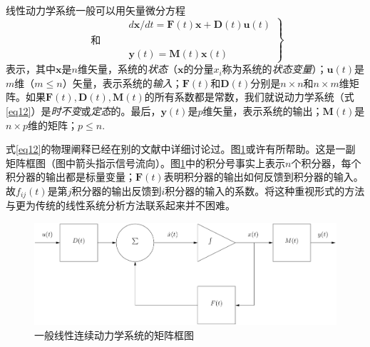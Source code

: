 \documentclass[UTF8,adobefonts]{ctexart}
\begin{document}
线性动力学系统一般可以用矢量微分方程
\begin{equation}
\label{eq12}
\left.\begin{aligned}
&d\mathbf{x}/dt=\mathbf{F}(t)\mathbf{x}+\mathbf{D}(t)\mathbf{u}(t)\\
\text{和}\qquad&\\
&\mathbf{y}(t)=\mathbf{M}(t)\mathbf{x}(t)
\end{aligned}\right\}
\end{equation}
表示，其中$\mathbf{x}$是$n$维矢量，系统的\emph{状态}（$\mathbf{x}$的分量$x_i$称为系统的\emph{状态变量}）；$\mathbf{u}(t)$是$m$维（$m \le n$）矢量，表示系统的\emph{输入}；$\mathbf{F}(t)$和$\mathbf{D}(t)$分别是$n \times n$和$n \times m$维矩阵。如果$\mathbf{F}(t),\mathbf{D}(t),\mathbf{M}(t)$的所有系数都是常数，我们就说动力学系统（式\ref{eq12}）是\emph{时不变}或\emph{定态}的。最后，$\mathbf{y}(t)$是$p$维矢量，表示系统的输出；$\mathbf{M}(t)$是$n \times p$维的矩阵；$p \le n$.

式\ref{eq12}的物理阐释已经在别的文献中详细讨论过\cite{rf18,rf20,rf23}。图\ref{fg1}或许有所帮助。这是一副矩阵框图（图中箭头指示信号流向）。图\ref{fg1}中的积分号事实上表示$n$个积分器，每个积分器的输出都是标量变量；$\mathbf{F}(t)$表明积分器的输出如何反馈到积分器的输入。故$f_{ij}(t)$是第$j$积分器的输出反馈到$i$积分器的输入的系数。将这种重视形式的方法与更为传统的线性系统分析方法联系起来并不困难。
\begin{figure}[htbp]
\centering
\includegraphics[width=0.5\paperwidth]{fig/fg1.pdf}
\caption{一般线性连续动力学系统的矩阵框图}
\label{fg1}
\end{figure}
\end{document}
